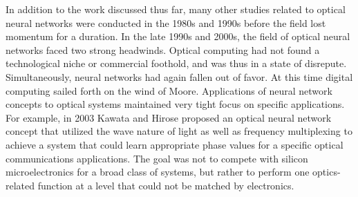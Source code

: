 In addition to the work discussed thus far, many other studies related to optical neural networks were conducted in the 1980s and 1990s \cite{fili1987,maar1987,safi1995,mo2000} before the field lost momentum for a duration. In the late 1990s and 2000s, the field of optical neural networks faced two strong headwinds. Optical computing had not found a technological niche or commercial foothold, and was thus in a state of disrepute. Simultaneously, neural networks had again fallen out of favor. At this time digital computing sailed forth on the wind of Moore. Applications of neural network concepts to optical systems maintained very tight focus on specific applications. For example, in 2003 Kawata and Hirose proposed an optical neural network concept that utilized the wave nature of light as well as frequency multiplexing to achieve a system that could learn appropriate phase values for a specific optical communications applications. The goal was not to compete with silicon microelectronics for a broad class of systems, but rather to perform one optics-related function at a level that could not be matched by electronics.



